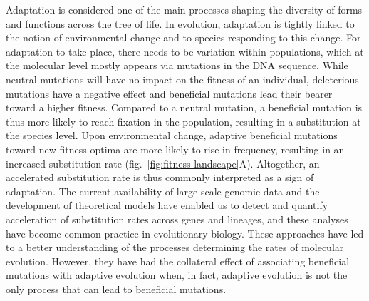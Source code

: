 \documentclass{article}
\begin{document}
    Adaptation is considered one of the main processes shaping the diversity of forms and functions across the tree of life\cite{darwin_origin_1859}.
    In evolution, adaptation is tightly linked to the notion of environmental change and to species responding to this change\cite{merrell_adaptive_1994, gavrilets_adaptive_2009}.
    For adaptation to take place, there needs to be variation within populations, which at the molecular level mostly appears via mutations in the DNA sequence.
    While neutral mutations will have no impact on the fitness of an individual, deleterious mutations have a negative effect and beneficial mutations lead their bearer toward a higher fitness.
    Compared to a neutral mutation, a beneficial mutation is thus more likely to reach fixation in the population, resulting in a substitution at the species level.
    Upon environmental change, adaptive beneficial mutations toward new fitness optima are more likely to rise in frequency, resulting in an increased substitution rate (fig.~\ref{fig:fitness-landscape}A).
    Altogether, an accelerated substitution rate is thus commonly interpreted as a sign of adaptation\cite{mcdonald_adaptative_1991, smith_adaptive_2002, welch_estimating_2006}.
    The current availability of large-scale genomic data and the development of theoretical models have enabled us to detect and quantify acceleration of substitution rates across genes and lineages, and these analyses have become common practice in evolutionary biology\cite{yang_statistical_2000, eyre-walker_genomic_2006, moutinho_variation_2019}.
    These approaches have led to a better understanding of the processes determining the rates of molecular evolution.
    However, they have had the collateral effect of associating beneficial mutations with adaptive evolution when, in fact, adaptive evolution is not the only process that can lead to beneficial mutations\cite{charlesworth_other_2007, mustonen_fitness_2009}.
\end{document}
